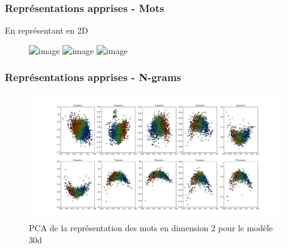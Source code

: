 \documentclass{beamer}
\begin{document}

\begin{frame}
\frametitle{Représentations apprises - Mots}
 En représentant en 2D
\begin{figure}[htp]
\centering
\includegraphics<1->[width=0.45\textwidth]{fig/WordPlot.png}
\includegraphics<2>[width=0.45\textwidth]{fig/NewModelPCA.png}
\includegraphics<3>[width=0.45\textwidth]{fig/model2d.png}
\caption{}
\end{figure}

\end{frame}

\begin{frame}
\frametitle{Représentations apprises - N-grams}
\begin{figure}[htp]
\centering
\includegraphics[scale=0.2]{fig/n_gram.png}
\caption[caption]{PCA de la représentation des mots en dimension 2 pour le modèle 30d}
\end{figure}
\end{frame}

\end{document}
